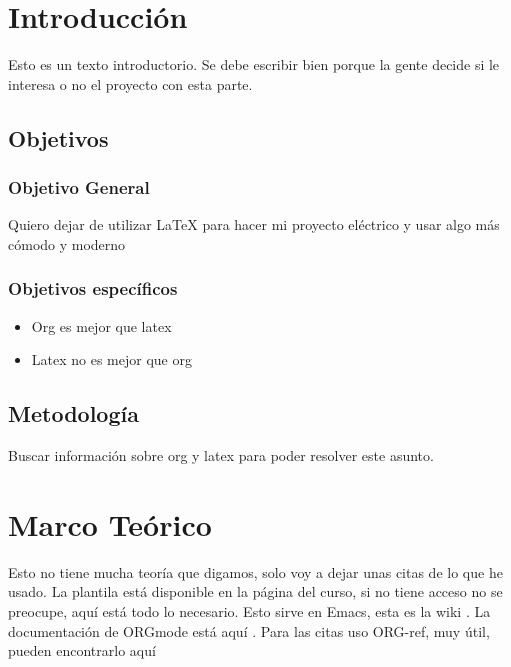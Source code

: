 \documentclass{proyectoelectrico}
\date{\today}
\title{}
\begin{document}
\begin{LaTeX}
\frontmatter
\portada
\aprobacion







\tableofcontents
\listoffigures
\listoftables



\mainmatter
\end{LaTeX}

\chapter{Introducción}
\label{sec:org771cc48}

Esto es un texto introductorio. Se debe escribir bien porque la gente decide si le interesa o no el
proyecto con esta parte.


\section{Objetivos}
\label{sec:org8731f97}
\subsection{Objetivo General}
\label{sec:orgf205699}

Quiero dejar de utilizar \LaTeX{} para hacer mi proyecto eléctrico y usar algo más cómodo y moderno

\subsection{Objetivos específicos}
\label{sec:org2e712d8}
\begin{itemize}
\item Org es mejor que latex
\item Latex no es mejor que org
\end{itemize}

\section{Metodología}
\label{sec:org1552d28}
Buscar información sobre org y latex para poder resolver este asunto.

\chapter{Marco Teórico}
\label{sec:orgd4060a0}
Esto no tiene mucha teoría que digamos, solo voy a dejar unas citas de lo que he usado. La plantila
está disponible en la página del curso, si no tiene acceso no se preocupe, aquí está todo lo
necesario. Esto sirve en Emacs, esta es la wiki \cite{emacs_wiki}. La documentación de ORGmode está
aquí \cite{org_wiki}. Para las citas uso ORG-ref, muy útil, pueden encontrarlo aquí \cite{org_ref}
\end{document}
